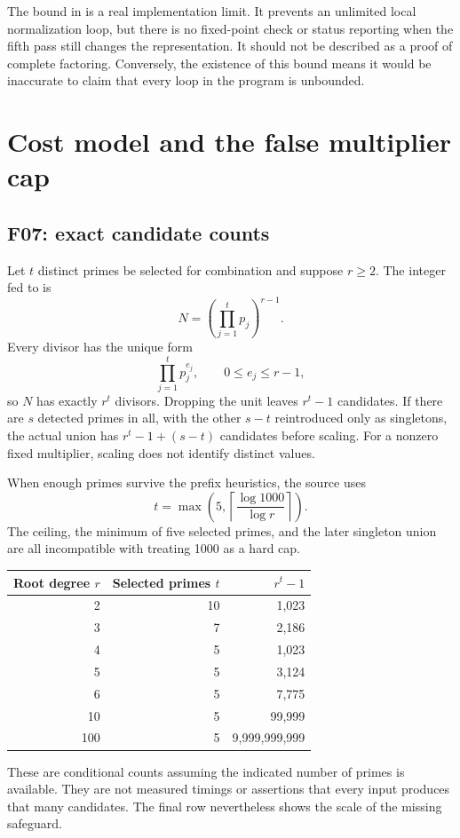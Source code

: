 \documentclass[11pt,letterpaper]{article}
\newcommand{\code}[1]{\texttt{\detokenize{#1}}}
\theoremstyle{definition}
\theoremstyle{remark}
\begin{document}
The \code{j < 5} bound in \code{fullfactor} is a real implementation limit.
It prevents an unlimited local normalization loop, but there is no fixed-point
check or status reporting when the fifth pass still changes the representation.
It should not be described as a proof of complete factoring. Conversely, the
existence of this bound means it would be inaccurate to claim that every loop
in the program is unbounded.

\section{Cost model and the false multiplier cap}
\label{sec:cost}
\subsection{F07: exact candidate counts}
Let $t$ distinct primes be selected for combination and suppose $r\ge2$.
The integer fed to \code{Divisors} is
\[
 N=\left(\prod_{j=1}^{t}p_j\right)^{r-1}.
\]
Every divisor has the unique form
\[
 \prod_{j=1}^{t}p_j^{e_j},\qquad 0\le e_j\le r-1,
\]
so $N$ has exactly $r^t$ divisors. Dropping the unit leaves $r^t-1$ candidates.
If there are $s$ detected primes in all, with the other $s-t$ reintroduced only
as singletons, the actual union has $r^t-1+(s-t)$ candidates before scaling.
For a nonzero fixed multiplier, scaling does not identify distinct values.

When enough primes survive the prefix heuristics, the source uses
\[
 t=\max\left(5,\left\lceil\frac{\log1000}{\log r}\right\rceil\right).
\]
The ceiling, the minimum of five selected primes, and the later singleton
union are all incompatible with treating 1000 as a hard cap.
\begin{center}
\begin{tabular}{@{}rrr@{}}
\toprule
Root degree $r$ & Selected primes $t$ & $r^t-1$ \\
\midrule
2 & 10 & 1,023 \\
3 & 7 & 2,186 \\
4 & 5 & 1,023 \\
5 & 5 & 3,124 \\
6 & 5 & 7,775 \\
10 & 5 & 99,999 \\
100 & 5 & 9,999,999,999 \\
\bottomrule
\end{tabular}
\end{center}
These are conditional counts assuming the indicated number of primes is
available. They are not measured timings or assertions that every input
produces that many candidates. The final row nevertheless shows the scale of
the missing safeguard.
\end{document}
